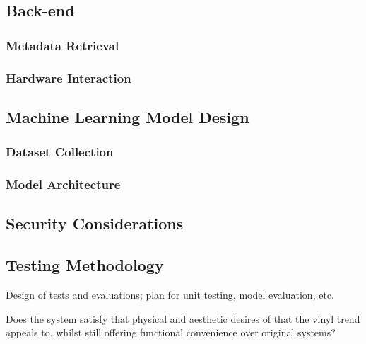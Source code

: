       \subsection{Back-end}
    
          \subsubsection{Metadata Retrieval}
          
          \subsubsection{Hardware Interaction}
      
      \subsection{Machine Learning Model Design}
          \subsubsection{Dataset Collection}
    
          \subsubsection{Model Architecture}
    
      \subsection{Security Considerations}
    
      \subsection{Testing Methodology}
          Design of tests and evaluations; plan for unit testing, model evaluation, etc.
    
          Does the system satisfy that physical and aesthetic desires of that the vinyl trend appeals to, whilst still offering functional convenience over original systems?
    
